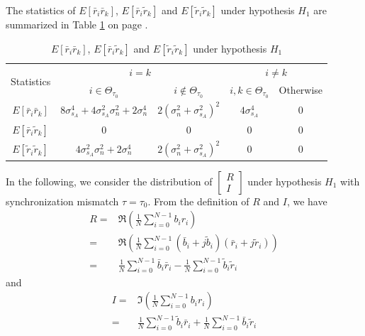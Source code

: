 The statistics of $E[\bar{r}_i\bar{r}_k]$, $E[\bar{r}_i\tilde{r}_k]$ and $E[\tilde{r}_i\tilde{r}_k]$ under hypothesis $H_1$ are summarized in Table \ref{Table3} on page \pageref{Table3}. 
\begin{table}[h]
\centering
\begin{tabular}{|c|c|c|c|c|}
\hline
\multirow{2}{*}{Statistics} & \multicolumn{2}{c|}{$i = k$}                                                              & \multicolumn{2}{c|}{$i \neq k$}        \\ \cline{2-5} 
                            & $i\in \Theta_{\tau_0}$                                 & $i \notin \Theta_{\tau_0}$       & $i, k \in \Theta_{\tau_0}$ & Otherwise  \\ \hline
$E[\bar{r}_i\bar{r}_k]$     & $8\sigma_{s_A}^4+4\sigma_{s_A}^2\sigma_n^2+2\sigma_n^4$ & $2(\sigma_n^2+\sigma_{s_A}^2)^2$ & $4\sigma_{s_A}^4$          & $0$       \\ \hline
$E[\bar{r}_i\tilde{r}_k]$   & $0$                                                    & $0$                              & $0$                        & $0$       \\ \hline
$E[\tilde{r}_i\tilde{r}_k]$ & $4\sigma_{s_A}^2\sigma_n^2+2\sigma_n^4$                & $2(\sigma_n^2+\sigma_{s_A}^2)^2$ & $0$                        & $0$       \\ \hline
\end{tabular}
\caption{$E[\bar{r}_i\bar{r}_k]$, $E[\bar{r}_i\tilde{r}_k]$ and $E[\tilde{r}_i\tilde{r}_k]$ under hypothesis $H_1$}
\label{Table3}
\end{table}

In the following, we consider the distribution of $\begin{bmatrix}
  R \\
  I
\end{bmatrix}$ under hypothesis $H_1$ with synchronization mismatch $\tau = \tau_0$.
From the definition of $R$ and $I$, we have 
\begin{equation}
  \begin{split}
	R = &\Re{(\frac{1}{N}\sum_{i=0}^{N-1} b_ir_i)}\\
	= &\Re(\frac{1}{N}\sum_{i=0}^{N-1}(\bar{b}_i+j\tilde{b}_i)(\bar{r}_i+j\tilde{r}_i))\\
	= &\frac{1}{N}\sum_{i=0}^{N-1}\bar{b}_i\bar{r}_i - \frac{1}{N}\sum_{i=0}^{N-1}\tilde{b}_i\tilde{r}_i
  \end{split}
  \label{R}
\end{equation}
and
\begin{equation}
  \begin{split}
	I = &\Im(\frac{1}{N}\sum_{i=0}^{N-1} b_ir_i)\\
	= &\frac{1}{N}\sum_{i=0}^{N-1}\tilde{b}_i\bar{r}_i + \frac{1}{N}\sum_{i=0}^{N-1}\bar{b}_i\tilde{r}_i
  \end{split}
  \label{I}
\end{equation}

